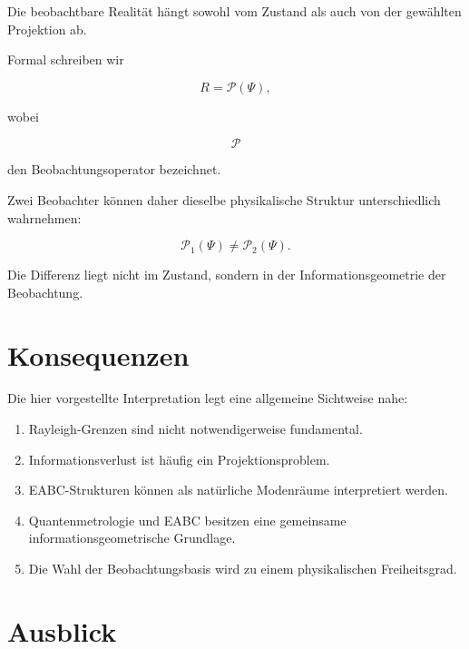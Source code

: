 \documentclass[11pt,a4paper]{article}
\theoremstyle{remark}
\begin{document}
	Die beobachtbare Realität hängt sowohl vom Zustand als auch von der
	gewählten Projektion ab.
	
	Formal schreiben wir
	
	\begin{equation}
		R
		=
		\mathcal P(\Psi),
	\end{equation}
	
	wobei
	
	\[
	\mathcal P
	\]
	
	den Beobachtungsoperator bezeichnet.
	
	Zwei Beobachter können daher dieselbe physikalische Struktur
	unterschiedlich wahrnehmen:
	
	\begin{equation}
		\mathcal P_1(\Psi)
		\neq
		\mathcal P_2(\Psi).
	\end{equation}
	
	Die Differenz liegt nicht im Zustand, sondern in der
	Informationsgeometrie der Beobachtung.
	
	\section{Konsequenzen}
	
	Die hier vorgestellte Interpretation legt eine allgemeine Sichtweise
	nahe:
	
	\begin{enumerate}[label=\arabic*.]
		
		\item Rayleigh-Grenzen sind nicht notwendigerweise fundamental.
		
		\item Informationsverlust ist häufig ein Projektionsproblem.
		
		\item EABC-Strukturen können als natürliche Modenräume interpretiert
		werden.
		
		\item Quantenmetrologie und EABC besitzen eine gemeinsame
		informationsgeometrische Grundlage.
		
		\item Die Wahl der Beobachtungsbasis wird zu einem physikalischen
		Freiheitsgrad.
		
	\end{enumerate}
	
	\section{Ausblick}
	
\end{document}

